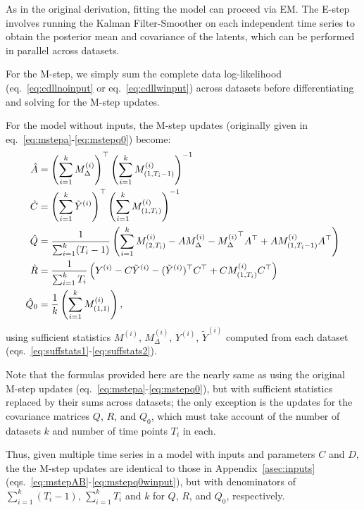 \documentclass[10pt]{article}
\begin{document}
\begin{appendices}
As in the original derivation, fitting the model can proceed via EM.
The E-step involves running the Kalman Filter-Smoother on each
independent time series to obtain the posterior mean and covariance of
the latents, which can be performed in parallel across datasets.

For the M-step, we simply sum the complete data log-likelihood
(eq.~\ref{eq:cdllnoinput} or eq.~\ref{eq:cdllwinput}) across datasets
before differentiating and solving for the M-step updates.

For the model without inputs, the M-step updates (originally given in
eq.~\ref{eq:mstepa}-\ref{eq:mstepq0}) become:
\begin{align}
  \label{eq:mstepmulti}
  \hat A &= \left(\sum_{i=1}^kM^{(i)}_\Delta\right)^\top  \left( \sum_{i=1}^kM^{(i)}_{(1,T_i-1)}\right)^{-1} 
  \\
  \hat C &= \left(\sum_{i=1}^k {\tilde Y}^{(i)}\right)^\top  \left(\sum_{i=1}^k
           M^{(i)}_{(1,T_i)} \right)^{-1}
  \\
  \hat Q &= \frac{1}{\sum_{i=1}^k (T_i-1)} \left(  \sum_{i=1}^k M^{(i)}_{(2,T_i)}
                                           -  A  M^{(i)}_\Delta
                                           - {M^{(i)}_\Delta}^\top A^\top
                                           + A  M^{(i)}_{(1,T_i-1)}A^\top  \right)  \\
 \hat R &= \frac{1}{\sum_{i=1}^k T_i}  \left(  Y^{(i)}
                                          -  C {\tilde Y}^{(i)}
                                           - ({\tilde Y}^{(i)})^\top  C^\top
                                          + C  M^{(i)}_{(1,T_i)}C^\top
          \right) \\
 \hat Q_0 &= \frac{1}{k} \left( \sum_{i=1}^k M^{(i)}_{(1,1)} \right), 
\end{align}
using sufficient statistics $M^{(i)}$, $M^{(i)}_\Delta$, $Y^{(i)}$,
${\tilde Y}^{(i)}$ computed from each dataset
(eqs.~\ref{eq:suffstats1}-\ref{eq:suffstats2}).

Note that the formulas provided here are the nearly same as using the
original M-step updates (eq.~\ref{eq:mstepa}-\ref{eq:mstepq0}), but
with sufficient statistics replaced by their sums across datasets; the
only exception is the updates for the covariance matrices $Q$, $R$,
and $Q_0$, which must take account of the number of datasets $k$ and
number of time points $T_i$ in each.

Thus, given multiple time series in a model with inputs and parameters
$C$ and $D$, the the M-step updates are identical to those in
Appendix~\ref{asec:inputs} (eqs.~\ref{eq:mstepAB}-\ref{eq:mstepq0winput}),
but with denominators of $\sum_{i=1}^k (T_i-1)$,
$\sum_{i=1}^k T_i$ and $k$ for $Q$, $R$, and $Q_0$, respectively.


\end{appendices}
\end{document}
